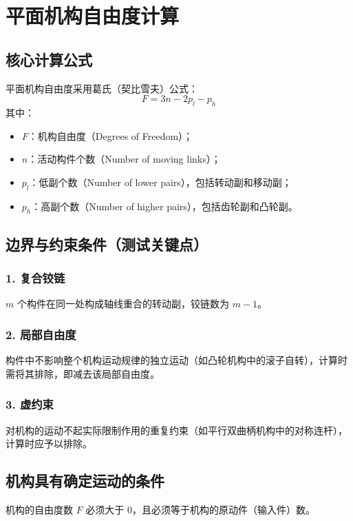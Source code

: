 \section*{平面机构自由度计算}

\subsection*{核心计算公式}
平面机构自由度采用葛氏（契比雪夫）公式：
\begin{equation}
F = 3n - 2p_l - p_h
\end{equation}
其中：
\begin{itemize}
    \item $F$：机构自由度（Degrees of Freedom）；
    \item $n$：活动构件个数（Number of moving links）；
    \item $p_l$：低副个数（Number of lower pairs），包括转动副和移动副；
    \item $p_h$：高副个数（Number of higher pairs），包括齿轮副和凸轮副。
\end{itemize}

\subsection*{边界与约束条件（测试关键点）}

\subsubsection*{1. 复合铰链}
$m$ 个构件在同一处构成轴线重合的转动副，铰链数为 $m - 1$。

\subsubsection*{2. 局部自由度}
构件中不影响整个机构运动规律的独立运动（如凸轮机构中的滚子自转），计算时需将其排除，即减去该局部自由度。

\subsubsection*{3. 虚约束}
对机构的运动不起实际限制作用的重复约束（如平行双曲柄机构中的对称连杆），计算时应予以排除。

\subsection*{机构具有确定运动的条件}
机构的自由度数 $F$ 必须大于 0，且必须等于机构的原动件（输入件）数。